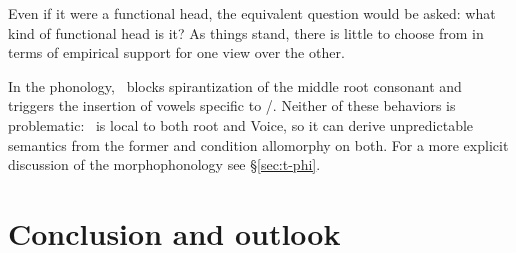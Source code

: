 Even if it were a functional head, the equivalent question would be asked: what kind of functional head is it? As things stand, there is little to choose from in terms of empirical support for one view over the other.

In the phonology, \va~blocks spirantization of the middle root consonant and triggers the insertion of vowels specific to \tpie/\thit. Neither of these behaviors is problematic: \va~is local to both root and Voice, so it can derive unpredictable semantics from the former and condition allomorphy on both. For a more explicit discussion of the morphophonology see \S\ref{sec:t-phi}.

\section{Conclusion and outlook} \label{voice:conc}


